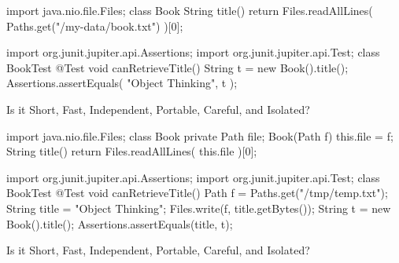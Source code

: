 \documentclass{article}
\begin{document}

\clearpage\begin{innoWide}{2}\small
\begin{ffcode}
import java.nio.file.Files;
class Book {
  String title() {
    return Files.readAllLines(
      Paths.get("/my-data/book.txt")
    )[0];
  }
}
\end{ffcode}
\par\columnbreak
\begin{ffcode}
import org.junit.jupiter.api.Assertions;
import org.junit.jupiter.api.Test;
class BookTest {
  @Test
  void canRetrieveTitle() {
    String t = new Book().title();
    Assertions.assertEquals(
      "Object Thinking", t
    );
  }
}
\end{ffcode}
\end{innoWide}
Is it Short, Fast, Independent, Portable, Careful, and Isolated?
\clearpage

\clearpage\begin{innoWide}{2}\small
\begin{ffcode}
import java.nio.file.Files;
class Book {
  private Path file;
  Book(Path f) {
    this.file = f;
  }
  String title() {
    return Files.readAllLines(
      this.file
    )[0];
  }
}
\end{ffcode}
\par\columnbreak
\begin{ffcode}
import org.junit.jupiter.api.Assertions;
import org.junit.jupiter.api.Test;
class BookTest {
  @Test
  void canRetrieveTitle() {
    Path f = Paths.get("/tmp/temp.txt");
    String title = "Object Thinking";
    Files.write(f, title.getBytes());
    String t = new Book().title();
    Assertions.assertEquals(title, t);
  }
}
\end{ffcode}
\end{innoWide}
Is it Short, Fast, Independent, Portable, Careful, and Isolated?
\clearpage
\end{document}
